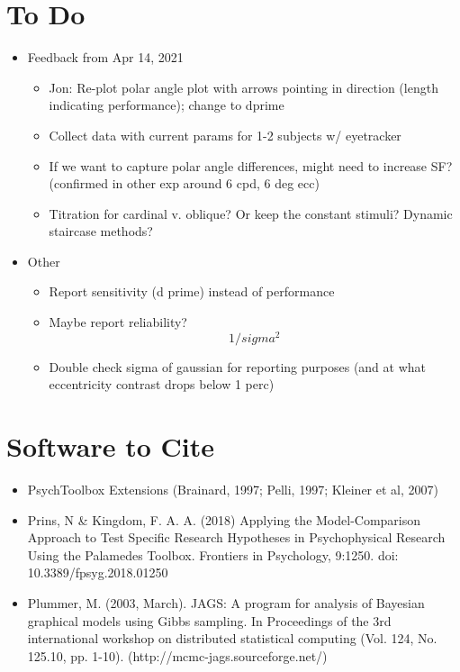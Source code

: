 \documentclass[11pt]{article} %
\begin{document}
\section{To Do} 
\begin{itemize}
\item Feedback from Apr 14, 2021
	\begin{itemize}
	\item Jon: Re-plot polar angle plot with arrows pointing in direction (length indicating performance); change to dprime
	\item Collect data with current params for 1-2 subjects w/ eyetracker
	\item If we want to capture polar angle differences, might need to increase SF? (confirmed in other exp around 6 cpd, 6 deg ecc)
	\item Titration for cardinal v. oblique? Or keep the constant stimuli? Dynamic staircase methods?
	\end{itemize}
\item Other
	\begin{itemize}
	\item Report sensitivity (d prime) instead of performance
	\item Maybe report reliability? \begin{equation}1/sigma^{2}\end{equation}
	\item Double check sigma of gaussian for reporting purposes (and at what eccentricity contrast drops below 1 perc)
	\end{itemize}
\end{itemize}

\section{Software to Cite}
\begin{itemize}
\item PsychToolbox Extensions (Brainard, 1997; Pelli, 1997; Kleiner et al, 2007)
\item Prins, N \& Kingdom, F. A. A. (2018) Applying the Model-Comparison Approach to Test Specific Research Hypotheses in Psychophysical Research Using the Palamedes Toolbox. Frontiers in Psychology, 9:1250. doi: 10.3389/fpsyg.2018.01250
\item Plummer, M. (2003, March). JAGS: A program for analysis of Bayesian graphical models using Gibbs sampling. In Proceedings of the 3rd international workshop on distributed statistical computing (Vol. 124, No. 125.10, pp. 1-10). (http://mcmc-jags.sourceforge.net/)
\end{itemize}
\end{document}
